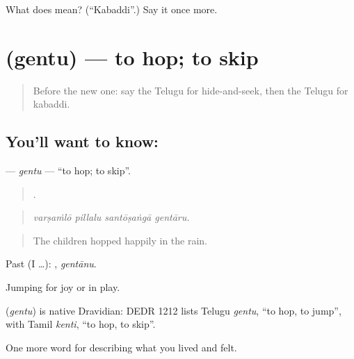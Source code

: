 \begin{tcolorbox}[breakable,colback=teal!4,colframe=teal!35!black,title={Before you move on}]
What does  mean? (\textquotedblleft{}Kabaddi\textquotedblright{}.) Say it once more.
\end{tcolorbox}
\section[\texorpdfstring{\te{గెంతు} (gentu)}{గెంతు (gentu)}]{ (gentu) — to hop; to skip}

\label{lesson:TE-C537-gentu}



\begin{quote}
Before the new one: say the Telugu for hide-and-seek, then the Telugu for kabaddi.
\end{quote}

\subsection*{You'll want to know: }
\textbf{} — \emph{gentu} — \textquotedblleft{}to hop; to skip\textquotedblright{}.

\begin{quote}
   .
\end{quote}

\begin{quote}
\emph{varṣaṁlō pillalu santōṣaṅgā gentāru.}
\end{quote}

\begin{quote}
The children hopped happily in the rain.
\end{quote}

Past (I …): , \emph{gentānu}.

Jumping for joy or in play.

\begin{cousinweb}
\textbf{} (\emph{gentu}) is native Dravidian: DEDR 1212 lists Telugu \emph{gentu}, \textquotedblleft{}to hop, to jump\textquotedblright{}, with Tamil \emph{kenti}, \textquotedblleft{}to hop, to skip\textquotedblright{}.
\end{cousinweb}

\begin{grammarlens}[title={What you've built}]
One more word for describing what you lived and felt.
\end{grammarlens}

